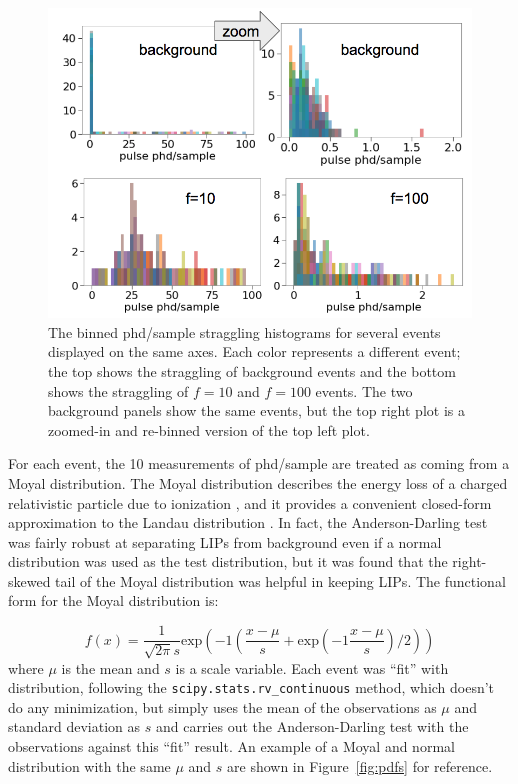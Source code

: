\begin{figure}[htbp]
\begin{center}
\includegraphics[width=\textwidth]{figures/lips/energy_distribution_lip_bkg.png}
\caption{The binned phd/sample straggling histograms for several events displayed on the same axes. Each color represents a different event; the top shows the straggling of background events and the bottom shows the straggling of $f=10$ and $f=100$ events. The two background panels show the same events, but the top right plot is a zoomed-in and re-binned version of the top left plot. }
\label{fig:energy_distribution_lip_bkg}
\end{center}
\end{figure}

For each event, the 10 measurements of phd/sample are treated as coming from a Moyal distribution. The Moyal distribution describes the energy loss of a charged relativistic particle due to ionization \cite{Moyal1955}, and it provides a convenient closed-form approximation to the Landau distribution \cite{Cordeiro2012}. In fact, the Anderson-Darling test was fairly robust at separating \ac{LIP}s from background even if a normal distribution was used as the test distribution, but it was found that the right-skewed tail of the Moyal distribution was helpful in keeping \ac{LIP}s. The functional form for the Moyal distribution is:

\begin{equation}
f(x) = \frac{1}{\sqrt{2 \pi}s}\mathrm{exp}(-1 ( \frac{x-\mu}{s} + \mathrm{exp}(-1\frac{x-\mu}{s} )/2))
\end{equation}
where $\mu$ is the mean and $s$ is a scale variable. Each event was ``fit'' with distribution, following the \texttt{scipy.stats.rv\_continuous} method, which doesn't do any minimization, but simply uses the mean of the observations as $\mu$ and standard deviation as $s$ and carries out the Anderson-Darling test with the observations against this ``fit'' result. An example of a Moyal and normal distribution with the same $\mu$ and $s$ are shown in Figure~\ref{fig:pdfs} for reference.


